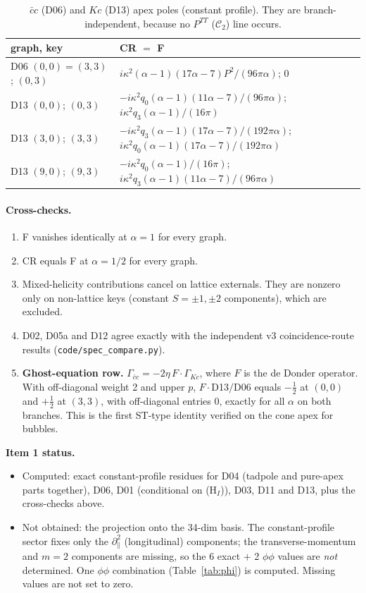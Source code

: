 \documentclass[11pt]{article}
\theoremstyle{definition}
\newcommand{\ka}{\kappa}
\newcommand{\Ccb}{\mathcal C}
\begin{document}
\begin{table}[h]\centering\small
\begin{tabular}{ll}\toprule
graph, key & CR $=$ F\\\midrule
D06 $(0,0)=(3,3)$; $(0,3)$ & $i\ka^2(\alpha-1)(17\alpha-7)P^2/(96\pi\alpha)$; $0$\\
D13 $(0,0)$; $(0,3)$ & $-i\ka^2q_0(\alpha-1)(11\alpha-7)/(96\pi\alpha)$; $i\ka^2q_3(\alpha-1)/(16\pi)$\\
D13 $(3,0)$; $(3,3)$ & $-i\ka^2q_3(\alpha-1)(17\alpha-7)/(192\pi\alpha)$; $i\ka^2q_0(\alpha-1)(17\alpha-7)/(192\pi\alpha)$\\
D13 $(9,0)$; $(9,3)$ & $-i\ka^2q_0(\alpha-1)/(16\pi)$; $i\ka^2q_3(\alpha-1)(11\alpha-7)/(96\pi\alpha)$\\\bottomrule
\end{tabular}
\caption{$\bar cc$ (D06) and $Kc$ (D13) apex poles (constant profile). They are branch-independent, because no $P^{TT}$ ($\Ccb_2$) line occurs.}\label{tab:gh}
\end{table}

\paragraph{Cross-checks.}
\begin{enumerate}
\item F vanishes identically at $\alpha=1$ for every graph.
\item CR equals F at $\alpha=1/2$ for every graph.
\item Mixed-helicity contributions cancel on lattice externals. They are nonzero only on non-lattice keys (constant $S=\pm1,\pm2$ components), which are excluded.
\item D02, D05a and D12 agree exactly with the independent v3 coincidence-route results (\texttt{code/spec\_compare.py}).
\item \textbf{Ghost-equation row.} $\Gamma_{\bar cc}=-2\eta\,F\cdot\Gamma_{Kc}$, where $F$ is the de Donder operator. With off-diagonal weight 2 and upper $p$, $F\cdot$D13$/$D06 equals $-\tfrac12$ at $(0,0)$ and $+\tfrac12$ at $(3,3)$, with off-diagonal entries 0, exactly for all $\alpha$ on both branches. This is the first ST-type identity verified on the cone apex for bubbles.
\end{enumerate}
\textbf{Item 1 status.}
\begin{itemize}
\item Computed: exact constant-profile residues for D04 (tadpole and pure-apex parts together), D06, D01 (conditional on (H$_I$)), D03, D11 and D13, plus the cross-checks above.
\item Not obtained: the projection onto the 34-dim basis. The constant-profile sector fixes only the $\partial_\parallel^2$ (longitudinal) components; the transverse-momentum and $m=2$ components are missing, so the 6 exact $+$ 2 $\phi\phi$ values are \emph{not} determined. One $\phi\phi$ combination (Table~\ref{tab:phi}) is computed. Missing values are not set to zero.
\end{itemize}
\end{document}
